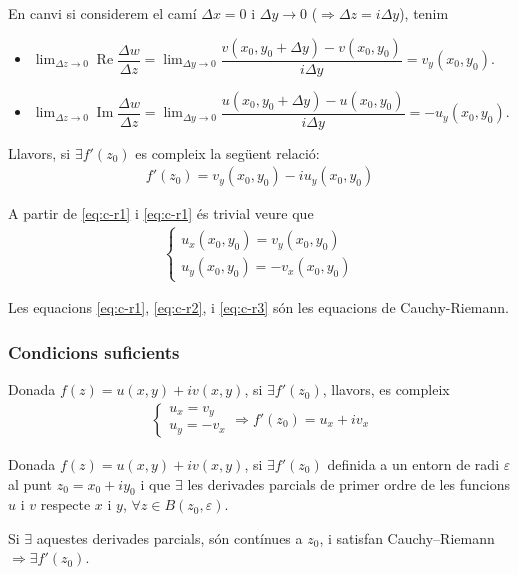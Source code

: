 En canvi si considerem el camí $\Delta x = 0$ i $\Delta y \to 0$ ($\Rightarrow \Delta z = i\Delta y$), tenim
\begin{itemize}
    \item $\displaystyle \lim_{\Delta z \to 0} \operatorname{Re} \dfrac{\Delta w}{\Delta z} = \lim_{\Delta y \to 0} \dfrac{v(x_{0}, y_{0} + \Delta y) - v(x_{0}, y_{0})}{i \Delta y} = v_{y}(x_{0}, y_{0})$.
    \item $\displaystyle \lim_{\Delta z \to 0} \operatorname{Im} \dfrac{\Delta w}{\Delta z} = \lim_{\Delta y \to 0} \dfrac{u(x_{0}, y_{0} + \Delta y) - u(x_{0}, y_{0})}{i \Delta y} = - u_{y}(x_{0}, y_{0})$.
\end{itemize}
Llavors, si $\exists f'(z_{0})$ es compleix la següent relació:
\begin{align}\label{eq:c-r2}
    f'(z_{0}) = v_{y}(x_{0},y_{0}) - i u_{y}(x_{0},y_{0})
\end{align}

A partir de \eqref{eq:c-r1} i \eqref{eq:c-r1} és trivial veure que
\begin{align}\label{eq:c-r3}
    \begin{cases} u_{x}(x_{0},y_{0}) = v_{y}(x_{0},y_{0}) \\ u_{y}(x_{0},y_{0}) = - v_{x}(x_{0},y_{0}) \end{cases}
\end{align}

Les equacions \eqref{eq:c-r1}, \eqref{eq:c-r2}, i \eqref{eq:c-r3} són les equacions de Cauchy-Riemann.
\subsubsection*{Condicions suficients}
\begin{thm}
    Donada $f(z) = u(x,y) + iv(x,y)$, si $\exists f'(z_{0})$, llavors, es compleix
    \begin{align}
        \begin{cases}u_{x} = v_{y} \\ u_{y} = - v_{x} \end{cases} \Rightarrow f'(z_{0}) = u_{x} + i v_{x}
    \end{align}
\end{thm}

\begin{thm}
    Donada $f(z) = u(x,y) + iv(x,y)$, si $\exists f'(z_{0})$ definida a un entorn de radi $\varepsilon$ al punt $z_{0} = x_{0} + i y_{0}$ i que $\exists$ les derivades parcials de primer ordre de les funcions $u$ i $v$ respecte $x$ i $y$, $\forall z \in B(z_{0}, \varepsilon)$. 
    
    Si $\exists$ aquestes derivades parcials, són contínues a $z_{0}$, i satisfan Cauchy--Riemann $\Rightarrow \exists f'(z_{0})$.
\end{thm}


